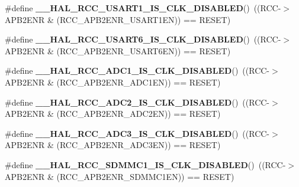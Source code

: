 \begin{DoxyCompactItemize}
\#define {\bfseries \+\_\+\+\_\+\+H\+A\+L\+\_\+\+R\+C\+C\+\_\+\+U\+S\+A\+R\+T1\+\_\+\+I\+S\+\_\+\+C\+L\+K\+\_\+\+D\+I\+S\+A\+B\+L\+ED}()~((R\+CC-\/$>$A\+P\+B2\+E\+NR \& (R\+C\+C\+\_\+\+A\+P\+B2\+E\+N\+R\+\_\+\+U\+S\+A\+R\+T1\+EN)) == R\+E\+S\+ET)
\item 
\mbox{\label{group___r_c_c_ex___peripheral___clock___enable___disable___status_ga0c3fd42d5fb38243e195ed04d7390672}} 
\#define {\bfseries \+\_\+\+\_\+\+H\+A\+L\+\_\+\+R\+C\+C\+\_\+\+U\+S\+A\+R\+T6\+\_\+\+I\+S\+\_\+\+C\+L\+K\+\_\+\+D\+I\+S\+A\+B\+L\+ED}()~((R\+CC-\/$>$A\+P\+B2\+E\+NR \& (R\+C\+C\+\_\+\+A\+P\+B2\+E\+N\+R\+\_\+\+U\+S\+A\+R\+T6\+EN)) == R\+E\+S\+ET)
\item 
\mbox{\label{group___r_c_c_ex___peripheral___clock___enable___disable___status_gac9f006a3c1b75c06270f0ae5a2c3ed07}} 
\#define {\bfseries \+\_\+\+\_\+\+H\+A\+L\+\_\+\+R\+C\+C\+\_\+\+A\+D\+C1\+\_\+\+I\+S\+\_\+\+C\+L\+K\+\_\+\+D\+I\+S\+A\+B\+L\+ED}()~((R\+CC-\/$>$A\+P\+B2\+E\+NR \& (R\+C\+C\+\_\+\+A\+P\+B2\+E\+N\+R\+\_\+\+A\+D\+C1\+EN)) == R\+E\+S\+ET)
\item 
\mbox{\label{group___r_c_c_ex___peripheral___clock___enable___disable___status_ga0768b7e93fe5c5d335e4da3cac2218b6}} 
\#define {\bfseries \+\_\+\+\_\+\+H\+A\+L\+\_\+\+R\+C\+C\+\_\+\+A\+D\+C2\+\_\+\+I\+S\+\_\+\+C\+L\+K\+\_\+\+D\+I\+S\+A\+B\+L\+ED}()~((R\+CC-\/$>$A\+P\+B2\+E\+NR \& (R\+C\+C\+\_\+\+A\+P\+B2\+E\+N\+R\+\_\+\+A\+D\+C2\+EN)) == R\+E\+S\+ET)
\item 
\mbox{\label{group___r_c_c_ex___peripheral___clock___enable___disable___status_ga671297f1622638efa2acc4951639a95b}} 
\#define {\bfseries \+\_\+\+\_\+\+H\+A\+L\+\_\+\+R\+C\+C\+\_\+\+A\+D\+C3\+\_\+\+I\+S\+\_\+\+C\+L\+K\+\_\+\+D\+I\+S\+A\+B\+L\+ED}()~((R\+CC-\/$>$A\+P\+B2\+E\+NR \& (R\+C\+C\+\_\+\+A\+P\+B2\+E\+N\+R\+\_\+\+A\+D\+C3\+EN)) == R\+E\+S\+ET)
\item 
\mbox{\label{group___r_c_c_ex___peripheral___clock___enable___disable___status_ga4f1420c6464c2c914b150c52ce7e551d}} 
\#define {\bfseries \+\_\+\+\_\+\+H\+A\+L\+\_\+\+R\+C\+C\+\_\+\+S\+D\+M\+M\+C1\+\_\+\+I\+S\+\_\+\+C\+L\+K\+\_\+\+D\+I\+S\+A\+B\+L\+ED}()~((R\+CC-\/$>$A\+P\+B2\+E\+NR \& (R\+C\+C\+\_\+\+A\+P\+B2\+E\+N\+R\+\_\+\+S\+D\+M\+M\+C1\+EN)) == R\+E\+S\+ET)

\end{DoxyCompactItemize}
